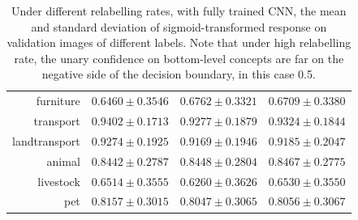 \documentclass[11pt,a4paper]{book}
\begin{document}
\begin{table}[htbp]
\begin{tabular}{r|c|c|c}
furniture     & $0.6460\pm0.3546$ & $0.6762\pm0.3321$ & $0.6709\pm0.3380$\\
transport     & $0.9402\pm0.1713$ & $0.9277\pm0.1879$ & $0.9324\pm0.1844$\\
landtransport & $0.9274\pm0.1925$ & $0.9169\pm0.1946$ & $0.9185\pm0.2047$\\
animal        & $0.8442\pm0.2787$ & $0.8448\pm0.2804$ & $0.8467\pm0.2775$\\
livestock     & $0.6514\pm0.3555$ & $0.6260\pm0.3626$ & $0.6530\pm0.3550$\\
pet           & $0.8157\pm0.3015$ & $0.8047\pm0.3065$ & $0.8056\pm0.3067$
\end{tabular}
\caption{Under different relabelling rates, with fully trained CNN, the mean and standard deviation of sigmoid-transformed response on validation images of different labels. Note that under high relabelling rate, the unary confidence on bottom-level concepts are far on the negative side of the decision boundary, in this case 0.5.}
\label{tab:cnnresp}
\end{table}
\end{document}

